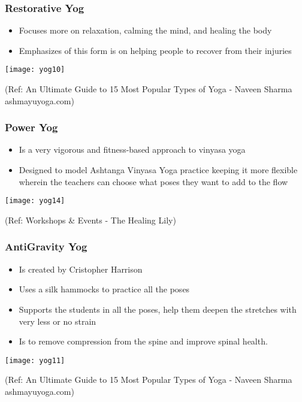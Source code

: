 \begin{frame}[fragile]\frametitle{Restorative Yog}
	\begin{itemize}
	\item Focuses more on relaxation, calming the mind, and healing the body
	\item Emphasizes of this form is on helping people to recover from their injuries
	\end{itemize}

\begin{center}
\texttt{[image: yog10]}

\tiny{(Ref: An Ultimate Guide to 15 Most Popular Types of Yoga - Naveen Sharma ashmayuyoga.com)}
\end{center}

\end{frame}

\begin{frame}[fragile]\frametitle{Power Yog}
	\begin{itemize}
	\item Is a very vigorous and fitness-based approach to vinyasa yoga
	\item Designed to model Ashtanga Vinyasa Yoga practice keeping it more flexible wherein the teachers can choose what poses they want to add to the flow
	\end{itemize}

\begin{center}
\texttt{[image: yog14]}

\tiny{(Ref: Workshops \& Events - The Healing Lily)}
\end{center}

\end{frame}

\begin{frame}[fragile]\frametitle{AntiGravity Yog}
	\begin{itemize}
	\item Is created by Cristopher Harrison
	\item Uses a silk hammocks to practice all the poses
	\item Supports the students in all the poses, help them deepen the stretches with very less or no strain
	\item Is to remove compression from the spine and improve spinal health.
	\end{itemize}

\begin{center}
\texttt{[image: yog11]}

\tiny{(Ref: An Ultimate Guide to 15 Most Popular Types of Yoga - Naveen Sharma ashmayuyoga.com)}
\end{center}
\end{frame}


